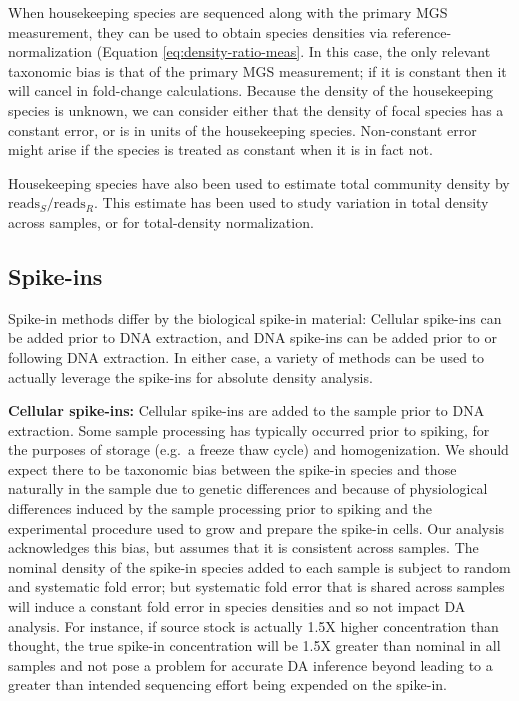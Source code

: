 \documentclass[
]{article}
\begin{document}
When housekeeping species are sequenced along with the primary MGS measurement, they can be used to obtain species densities via reference-normalization (Equation \eqref{eq:density-ratio-meas}.
In this case, the only relevant taxonomic bias is that of the primary MGS measurement; if it is constant then it will cancel in fold-change calculations.
Because the density of the housekeeping species is unknown, we can consider either that the density of focal species has a constant error, or is in units of the housekeeping species.
Non-constant error might arise if the species is treated as constant when it is in fact not.

Housekeeping species have also been used to estimate total community density by \(\text{reads}_{S} / \text{reads}_{R}\).
This estimate has been used to study variation in total density across samples, or for total-density normalization.

\hypertarget{spike-ins}{%
\subsection{Spike-ins}\label{spike-ins}}

Spike-in methods differ by the biological spike-in material:
Cellular spike-ins can be added prior to DNA extraction, and DNA spike-ins can be added prior to or following DNA extraction.
In either case, a variety of methods can be used to actually leverage the spike-ins for absolute density analysis.

\textbf{Cellular spike-ins:}
Cellular spike-ins are added to the sample prior to DNA extraction.
Some sample processing has typically occurred prior to spiking, for the purposes of storage (e.g.~a freeze thaw cycle) and homogenization.
We should expect there to be taxonomic bias between the spike-in species and those naturally in the sample due to genetic differences and because of physiological differences induced by the sample processing prior to spiking and the experimental procedure used to grow and prepare the spike-in cells.
Our analysis acknowledges this bias, but assumes that it is consistent across samples.
The nominal density of the spike-in species added to each sample is subject to random and systematic fold error; but systematic fold error that is shared across samples will induce a constant fold error in species densities and so not impact DA analysis.
For instance, if source stock is actually 1.5X higher concentration than thought, the true spike-in concentration will be 1.5X greater than nominal in all samples and not pose a problem for accurate DA inference beyond leading to a greater than intended sequencing effort being expended on the spike-in.
\end{document}
